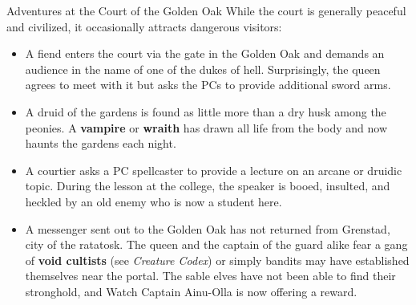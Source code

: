 \documentclass[10pt,a4paper,twoside,bg=print,twocolumn,openany,nodeprecatedcode]{dndbook}
\begin{document}
\begin{DndSidebar}[float=!b]{Adventures at the Court of the Golden Oak}
While the court is generally peaceful and civilized, it occasionally attracts dangerous visitors:




\begin{itemize}
\item A fiend enters the court via the gate in the Golden Oak and demands an audience in the name of one of the dukes of hell. Surprisingly, the queen agrees to meet with it but asks the PCs to provide additional sword arms.
\item A druid of the gardens is found as little more than a dry husk among the peonies. A \textbf{vampire} or \textbf{wraith} has drawn all life from the body and now haunts the gardens each night.
\item A courtier asks a PC spellcaster to provide a lecture on an arcane or druidic topic. During the lesson at the college, the speaker is booed, insulted, and heckled by an old enemy who is now a student here.
\item A messenger sent out to the Golden Oak has not returned from Grenstad, city of the ratatosk. The queen and the captain of the guard alike fear a gang of \textbf{void cultists} (see \textit{Creature Codex}) or simply bandits may have established themselves near the portal. The sable elves have not been able to find their stronghold, and Watch Captain Ainu-Olla is now offering a reward.
\end{itemize}



\end{DndSidebar}
\end{document}
